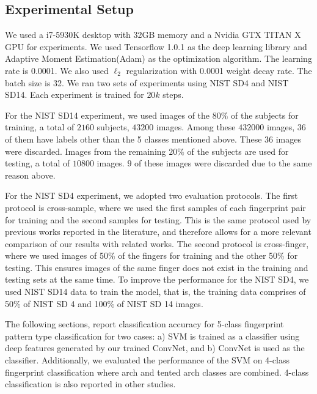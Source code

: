 \subsection{Experimental Setup}
We used a i7-5930K desktop with 32GB memory and a Nvidia GTX TITAN X GPU for experiments.
%
We used Tensorflow 1.0.1 as the deep learning library and Adaptive Moment Estimation(Adam\cite{kingma2014adam}) as the optimization algorithm. The learning rate is 0.0001. We also used $\ell_2$ regularization with 0.0001 weight decay rate. The batch size is 32. 
%
We ran two sets of experiments using NIST SD4 and NIST SD14.  Each experiment is trained for $20k$ steps.

For the NIST SD14 experiment, we used images of the $80\%$ of the subjects for training, a total of $2160$ subjects, $43200$ images. Among these $432000$ images, $36$ of them have labels other than the 5 classes mentioned above. These $36$ images were discarded. 
Images from the remaining $20\%$ of the subjects are used for testing, a total of $10800$ images. $9$ of these images were discarded due to the same reason above.
%

For the NIST SD4 experiment, we adopted two evaluation protocols.
%
The first protocol is cross-sample, where we used the first samples of each fingerprint pair for training and the second samples for testing.  This is the same protocol used by previous works reported in the literature, and therefore allows for a more relevant comparison of our results with related works.
The second protocol is cross-finger, where we used images of 50\% of the fingers for training and the other 50\% for testing. This ensures images of the same finger does not exist in the training and testing sets at the same time. To improve the performance for the NIST SD4, we used NIST SD14 data to train the model, that is, the training data comprises of 50\% of NIST SD 4 and 100\% of NIST SD 14 images.
 
The following sections, report classification accuracy for 5-class fingerprint pattern type classification for two cases: a) SVM is trained as a classifier using deep features generated by our trained ConvNet, and b) ConvNet is used as the classifier.
Additionally, we evaluated the performance of the SVM on 4-class fingerprint classification where arch and tented arch classes are combined. 4-class classification is also reported in other studies.  
%

